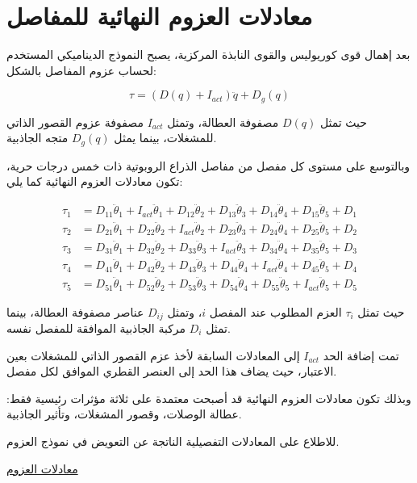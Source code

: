 \section{معادلات العزوم النهائية للمفاصل}

بعد إهمال قوى كوريوليس والقوى النابذة المركزية، يصبح النموذج الديناميكي المستخدم لحساب عزوم المفاصل بالشكل:

\[
\tau =
\left(D(q)+I_{act}\right)\ddot{q}
+
D_g(q)
\]

حيث تمثل $D(q)$ مصفوفة العطالة، وتمثل $I_{act}$ مصفوفة عزوم القصور الذاتي للمشغلات، بينما يمثل $D_g(q)$ متجه الجاذبية.

وبالتوسع على مستوى كل مفصل من مفاصل الذراع الروبوتية ذات خمس درجات حرية، تكون معادلات العزوم النهائية كما يلي:

\begin{align*}
\tau_1 &=
D_{11}\ddot{\theta}_1
+
I_{act}\ddot{\theta}_1
+
D_{12}\ddot{\theta}_2
+
D_{13}\ddot{\theta}_3
+
D_{14}\ddot{\theta}_4
+
D_{15}\ddot{\theta}_5
+
D_1
\\[0.3cm]
\tau_2 &=
D_{21}\ddot{\theta}_1
+
D_{22}\ddot{\theta}_2
+
I_{act}\ddot{\theta}_2
+
D_{23}\ddot{\theta}_3
+
D_{24}\ddot{\theta}_4
+
D_{25}\ddot{\theta}_5
+
D_2
\\[0.3cm]
\tau_3 &=
D_{31}\ddot{\theta}_1
+
D_{32}\ddot{\theta}_2
+
D_{33}\ddot{\theta}_3
+
I_{act}\ddot{\theta}_3
+
D_{34}\ddot{\theta}_4
+
D_{35}\ddot{\theta}_5
+
D_3
\\[0.3cm]
\tau_4 &=
D_{41}\ddot{\theta}_1
+
D_{42}\ddot{\theta}_2
+
D_{43}\ddot{\theta}_3
+
D_{44}\ddot{\theta}_4
+
I_{act}\ddot{\theta}_4
+
D_{45}\ddot{\theta}_5
+
D_4
\\[0.3cm]
\tau_5 &=
D_{51}\ddot{\theta}_1
+
D_{52}\ddot{\theta}_2
+
D_{53}\ddot{\theta}_3
+
D_{54}\ddot{\theta}_4
+
D_{55}\ddot{\theta}_5
+
I_{act}\ddot{\theta}_5
+
D_5
\end{align*}

حيث تمثل $\tau_i$ العزم المطلوب عند المفصل $i$، وتمثل $D_{ij}$ عناصر مصفوفة العطالة، بينما تمثل $D_i$ مركبة الجاذبية الموافقة للمفصل نفسه.

تمت إضافة الحد $I_{act}$ إلى المعادلات السابقة لأخذ عزم القصور الذاتي للمشغلات بعين الاعتبار، حيث يضاف هذا الحد إلى العنصر القطري الموافق لكل مفصل.

وبذلك تكون معادلات العزوم النهائية قد أصبحت معتمدة على ثلاثة مؤثرات رئيسية فقط: عطالة الوصلات، وقصور المشغلات، وتأثير الجاذبية.

للاطلاع على المعادلات التفصيلية الناتجة عن التعويض في نموذج العزوم.
\begin{center}
\href{file:///D:/Projects/latex/Studying_DIY_Arm/resources/equations/torque-equations.txt}
{معادلات العزوم}
\end{center}








